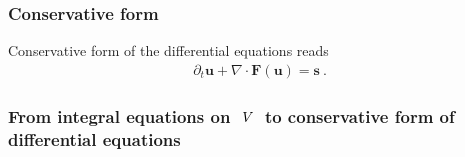 \documentclass[letterpaper,10pt,english]{jupyterBook}
\begin{document}
\subsubsection{Conservative form}
\label{\detokenize{ch/pde/hyperbolic-nd-draft:conservative-form}}\label{\detokenize{ch/pde/hyperbolic-nd-draft:pde-hyperbolic-nd-draft-differential-conservative}}
\sphinxAtStartPar
Conservative form of the differential equations reads
\begin{equation}\label{equation:ch/pde/hyperbolic-nd-draft:eq:pde:hyperbolic:differential:conservative}
\begin{split}
  \partial_t \mathbf{u} + \nabla \cdot \mathbf{F}(\mathbf{u}) = \mathbf{s} \ .
\end{split}
\end{equation}\subsubsection*{From integral equations on \protect\(\ V \ \protect\) to conservative form of differential equations}
\end{document}
